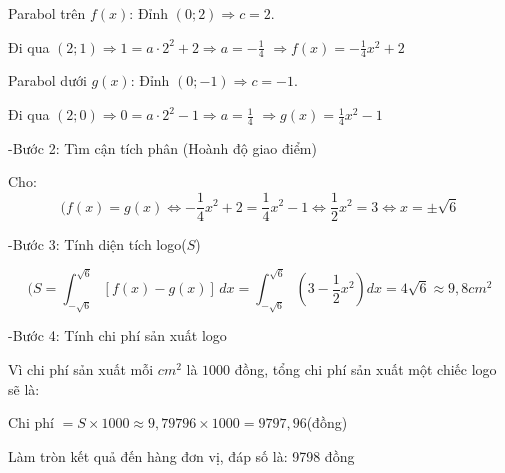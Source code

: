 \documentclass[12pt,a4paper,oneside]{book}
\theoremstyle{theorem}
\theoremstyle{definition}
\begin{document}
Parabol trên $f(x)$: Đỉnh $(0; 2) \Rightarrow c = 2$. 

Đi qua $(2; 1) \Rightarrow 1 = a \cdot 2^2 + 2 \Rightarrow a = -\frac{1}{4}$ $\Rightarrow f(x)=-\frac{1}{4}x^{2}+2$

Parabol dưới $g(x)$: Đỉnh $(0; -1) \Rightarrow c = -1$. 

Đi qua $(2; 0) \Rightarrow 0 = a \cdot 2^2 - 1 \Rightarrow a = \frac{1}{4}$
$\Rightarrow g(x)=\frac{1}{4}x^{2}-1$
\vspace{0.2cm}

-Bước 2: Tìm cận tích phân (Hoành độ giao điểm)

Cho:\[(f(x) = g(x) \Leftrightarrow -\frac{1}{4}x^2 + 2 = \frac{1}{4}x^2 - 1 \Leftrightarrow \frac{1}{2}x^2 = 3 \Leftrightarrow x = \pm\sqrt{6}\]

-Bước 3: Tính diện tích logo($S$)

\[(S=\int _{-\sqrt{6}}^{\sqrt{6}}[f(x)-g(x)]\,dx=\int _{-\sqrt{6}}^{\sqrt{6}}\left(3-\frac{1}{2}x^{2}\right)dx=4\sqrt{6}\approx 9,8 cm^2\]

-Bước 4: Tính chi phí sản xuất logo

Vì chi phí sản xuất mỗi $cm^2$ là $1000$ đồng, tổng chi phí sản xuất một chiếc logo sẽ là:

Chi phí $=S\times 1000\approx 9,79796\times 1000=9797,96 $(đồng)

Làm tròn kết quả đến hàng đơn vị, đáp số là: 9798 đồng
\end{document}
